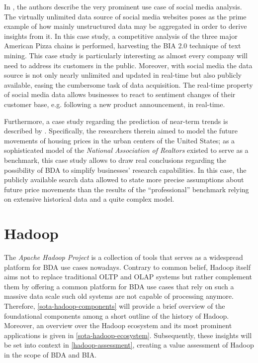 In \textcite{he2013social}, the authors describe the very prominent use case of social media analysis. The virtually unlimited data source of social media websites poses as the prime example of how mainly unstructured data may be aggregated in order to derive insights from it. In this case study, a competitive analysis of the three major American Pizza chains is performed, harvesting the \ac{BIA} 2.0 technique of text mining. This case study is particularly interesting as almost every company will need to address its customers in the public. Moreover, with social media the data source is not only nearly unlimited and updated in real-time but also publicly available, easing the cumbersome task of data acquisition. The real-time property of social media data allows businesses to react to sentiment changes of their customer base, e.g. following a new product announcement, in real-time.

Furthermore, a case study regarding the prediction of near-term trends is described by \textcite[p.~64]{mcafeebig}. Specifically, the researchers therein aimed to model the future movements of housing prices in the urban centers of the United States; as a sophisticated model of the \emph{National Association of Realtors} existed to serve as a benchmark, this case study allows to draw real conclusions regarding the possibility of \ac{BDA} to simplify businesses' research capabilities. In this case, the publicly available search data allowed to state more precise assumptions about future price movements than the results of the \enquote{professional} benchmark relying on extensive historical data and a quite complex model.



\section{Hadoop}
\label{sota-hadoop}
The \emph{Apache Hadoop Project} is a collection of tools that serves as a widespread platform for \ac{BDA} use cases nowadays. Contrary to common belief, Hadoop itself aims not to replace traditional \ac{OLTP} and \ac{OLAP} systems but rather complement them by offering a common platform for \ac{BDA} use cases that rely on such a massive data scale such old systems are not capable of processing anymore. Therefore, \autoref{sota-hadoop-components} will provide a brief overview of the foundational components among a short outline of the history of Hadoop. Moreover, an overview over the Hadoop ecosystem and its most prominent applications is given in \autoref{sota-hadoop-ecosystem}. Subsequently, these insights will be set into context in \autoref{hadoop-assessment}, creating a value assessment of Hadoop in the scope of \ac{BDA} and \ac{BIA}.

